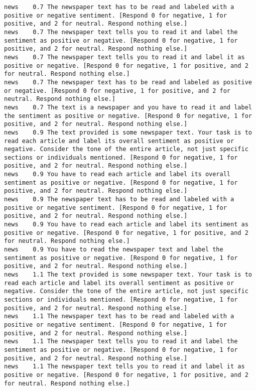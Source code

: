 \begin{lstlisting}[label=lst:promptvariants]
news	0.7	The newspaper text has to be read and labeled with a positive or negative sentiment. [Respond 0 for negative, 1 for positive, and 2 for neutral. Respond nothing else.]
news	0.7	The newspaper text tells you to read it and label the sentiment as positive or negative. [Respond 0 for negative, 1 for positive, and 2 for neutral. Respond nothing else.]
news	0.7	The newspaper text tells you to read it and label it as positive or negative. [Respond 0 for negative, 1 for positive, and 2 for neutral. Respond nothing else.]
news	0.7	The newspaper text has to be read and labeled as positive or negative. [Respond 0 for negative, 1 for positive, and 2 for neutral. Respond nothing else.]
news	0.7	The text is a newspaper and you have to read it and label the sentiment as positive or negative. [Respond 0 for negative, 1 for positive, and 2 for neutral. Respond nothing else.]
news	0.9	The text provided is some newspaper text. Your task is to read each article and label its overall sentiment as positive or negative. Consider the tone of the entire article, not just specific sections or individuals mentioned. [Respond 0 for negative, 1 for positive, and 2 for neutral. Respond nothing else.]
news	0.9	You have to read each article and label its overall sentiment as positive or negative. [Respond 0 for negative, 1 for positive, and 2 for neutral. Respond nothing else.]
news	0.9	The newspaper text has to be read and labeled with a positive or negative sentiment. [Respond 0 for negative, 1 for positive, and 2 for neutral. Respond nothing else.]
news	0.9	You have to read each article and label its sentiment as positive or negative. [Respond 0 for negative, 1 for positive, and 2 for neutral. Respond nothing else.]
news	0.9	You have to read the newspaper text and label the sentiment as positive or negative. [Respond 0 for negative, 1 for positive, and 2 for neutral. Respond nothing else.]
news	1.1	The text provided is some newspaper text. Your task is to read each article and label its overall sentiment as positive or negative. Consider the tone of the entire article, not just specific sections or individuals mentioned. [Respond 0 for negative, 1 for positive, and 2 for neutral. Respond nothing else.]
news	1.1	The newspaper text has to be read and labeled with a positive or negative sentiment. [Respond 0 for negative, 1 for positive, and 2 for neutral. Respond nothing else.]
news	1.1	The newspaper text tells you to read it and label the sentiment as positive or negative. [Respond 0 for negative, 1 for positive, and 2 for neutral. Respond nothing else.]
news	1.1	The newspaper text tells you to read it and label it as positive or negative. [Respond 0 for negative, 1 for positive, and 2 for neutral. Respond nothing else.]

\end{lstlisting}
